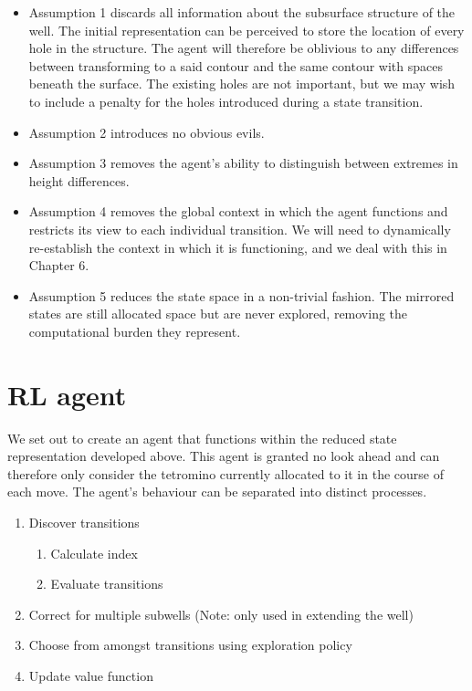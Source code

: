 \documentclass{rucsthesis}
\begin{document}
\begin{itemize}
\item{Assumption 1 discards all information about the subsurface structure of the well. The initial representation can be perceived to store the location of every hole in the structure. The agent will therefore be oblivious to any differences between transforming to a said contour and the same contour with spaces beneath the surface. The existing holes are not important, but we may wish to include a penalty for the holes introduced during a state transition.}
\item{Assumption 2 introduces no obvious evils.}
\item{Assumption 3 removes the agent's ability to distinguish between extremes in height differences.}
\item{Assumption 4 removes the global context in which the agent functions and restricts its view to each individual transition. We will need to dynamically re-establish the context in which it is functioning, and we deal with this in Chapter 6.}
\item{Assumption 5 reduces the state space in a non-trivial fashion. The mirrored states are still allocated space but are never explored, removing the computational burden they represent.}
\end{itemize}

\section{RL agent}

We set out to create an agent that functions within the reduced state representation developed above. This agent is granted no look ahead and can therefore only consider the tetromino currently allocated to it in the course of each move. The agent's behaviour can be separated into distinct processes.

\begin{enumerate}
\item{Discover transitions}
\begin{enumerate}
\item{Calculate index}
\item{Evaluate transitions}
\end{enumerate}
\item{Correct for multiple subwells (Note: only used in extending the well) }
\item{Choose from amongst transitions using exploration policy}
\item{Update value function}
\end{enumerate}
\end{document}
